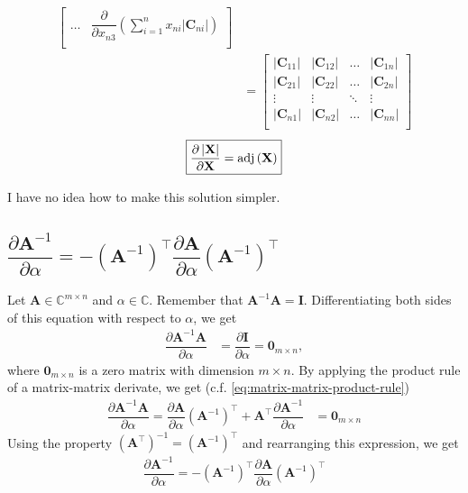 \documentclass{article}
\newcommand{\trans}{\top}
\newcommand{\adj}[1]{\ensuremath{\textnormal{adj}\left(#1\right)}} %
\newcommand\abs[1]{\left\lvert#1\right\rvert}
\begin{document}
\begin{align}
\begin{bmatrix}
        \dots & 
        \displaystyle \dfrac{\partial}{\partial x_{n3}} \left( \sum_{i = 1}^{n} x_{ni} \abs{\mathbf{C}_{ni}} \right) \\
    \end{bmatrix} \\
    &= \begin{bmatrix}
        \abs{\mathbf{C}_{11}} & \abs{\mathbf{C}_{12}} & \dots & \abs{\mathbf{C}_{1n}} \\
        \abs{\mathbf{C}_{21}} & \abs{\mathbf{C}_{22}} & \dots & \abs{\mathbf{C}_{2n}} \\
        \vdots & \vdots & \ddots & \vdots \\
        \abs{\mathbf{C}_{n1}} & \abs{\mathbf{C}_{n2}} & \dots & \abs{\mathbf{C}_{nn}} \\
    \end{bmatrix}
\end{align}
\begin{align}
    \boxed{\dfrac{\partial \abs{\mathbf{X}}}{\partial \mathbf{X}} = \adj{\mathbf{X}}}
\end{align}

I have no idea how to make this solution simpler.

\subsection{\(\dfrac{\partial \mathbf{A}^{-1}}{\partial \alpha} = - {\left( \mathbf{A}^{-1} \right)}^{\trans} \dfrac{\partial \mathbf{A}}{\partial \alpha} {\left( \mathbf{A}^{-1} \right)}^{\trans}\)}
Let \(\mathbf{A}\in \mathbb{C}^{m\times n}\) and \(\alpha \in \mathbb{C}\). Remember that \(\mathbf{A}^{-1}\mathbf{A} = \mathbf{I}\). Differentiating both sides of this equation with respect to \(\alpha\), we get
\begin{align}
    \dfrac{\partial \mathbf{A}^{-1}\mathbf{A}}{\partial \alpha} & = \dfrac{\partial \mathbf{I}}{\partial \alpha} = \mathbf{0}_{m \times n},
\end{align}
where \(\mathbf{0}_{m \times n}\) is a zero matrix with dimension \(m \times n\). By applying the product rule of a matrix-matrix derivate, we get (c.f. \eqref{eq:matrix-matrix-product-rule})
\begin{align}
    \dfrac{\partial \mathbf{A}^{-1}\mathbf{A}}{\partial \alpha} =  \dfrac{\partial \mathbf{A}}{\partial \alpha} \left( \mathbf{A}^{-1} \right)^{\trans} + \mathbf{A}^{\trans} \dfrac{\partial \mathbf{A}^{-1}}{\partial \alpha} & = \mathbf{0}_{m \times n}
\end{align}
Using the property \(\left( \mathbf{A}^{\trans} \right)^{-1} = \left( \mathbf{A}^{-1} \right)^{\trans}\) and rearranging this expression, we get
\begin{align}
    \boxed{\dfrac{\partial \mathbf{A}^{-1}}{\partial \alpha} = - {\left( \mathbf{A}^{-1} \right)}^{\trans} \dfrac{\partial \mathbf{A}}{\partial \alpha} {\left( \mathbf{A}^{-1} \right)}^{\trans}}
\end{align}

\nocite{*}
\printbibliography
\end{document}
